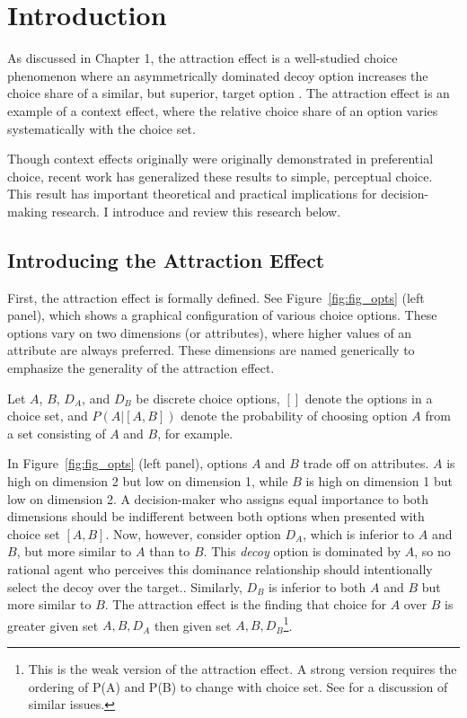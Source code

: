 \section{Introduction}
As discussed in Chapter 1, the attraction effect is a well-studied choice phenomenon where an asymmetrically dominated decoy option increases the choice share of a similar, but superior, target option \parencite{huberAddingAsymmetricallyDominated1982d}. The attraction effect is an example of a context effect, where the relative choice share of an option varies systematically with the choice set.

Though context effects originally were originally demonstrated in preferential choice, recent work has generalized these results to simple, perceptual choice. This result has important theoretical and practical implications for decision-making research. I introduce and review this research below.

\subsection{Introducing the Attraction Effect}

First, the attraction effect is formally defined. See Figure~\ref{fig:fig_opts} (left panel), which shows a graphical configuration of various choice options. These options vary on two dimensions (or attributes), where higher values of an attribute are always preferred. These dimensions are named generically to emphasize the generality of the attraction effect.

Let $A$, $B$, $D_{A}$, and $D_{B}$ be discrete choice options, $[]$ denote the options in a choice set, and $P(A|[A,B])$ denote the probability of choosing option $A$ from a set consisting of $A$ and $B$, for example. 

In Figure~\ref{fig:fig_opts} (left panel), options $A$ and $B$ trade off on attributes. $A$ is high on dimension 2 but low on dimension 1, while $B$ is high on dimension 1 but low on dimension 2. A decision-maker who assigns equal importance to both dimensions should be indifferent between both options when presented with choice set $[A,B]$. Now, however, consider option $D_{A}$, which is inferior to $A$ and $B$, but more similar to $A$ than to $B$. This \textit{decoy} option is dominated by $A$, so no rational agent who perceives this dominance relationship should intentionally select the decoy over the target.. Similarly, $D_{B}$ is inferior to both $A$ and $B$ but more similar to $B$. The attraction effect is the finding that choice for $A$ over $B$ is greater given set ${A,B,D_{A}}$ then given set $A,B,D_{B}$\footnote{This is the weak version of the attraction effect. A strong version requires the ordering of P(A) and P(B) to change with choice set. See \textcite{davis2023illustrated} for a discussion of similar issues.}\parencite{huberAddingAsymmetricallyDominated1982d}. 

